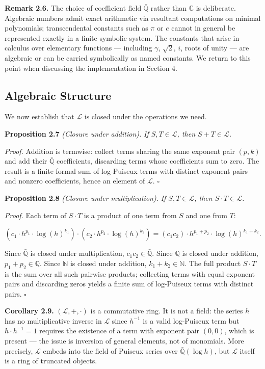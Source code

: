 \documentclass[12pt]{article}
\begin{document}
\textbf{Remark 2.6.} The choice of coefficient field
\(\bar{\mathbb{Q}}\) rather than \(\mathbb{C}\) is deliberate. Algebraic
numbers admit exact arithmetic via resultant computations on minimal
polynomials; transcendental constants such as \(\pi\) or \(e\) cannot in
general be represented exactly in a finite symbolic system. The
constants that arise in calculus over elementary functions --- including
\(\gamma\), \(\sqrt{2}\), \(i\), roots of unity --- are algebraic or can
be carried symbolically as named constants. We return to this point when
discussing the implementation in Section 4.


\subsection{Algebraic Structure}\label{algebraic-structure}

We now establish that \(\mathcal{L}\) is closed under the operations we
need.

\textbf{Proposition 2.7} \emph{(Closure under addition).} \emph{If
\(S, T \in \mathcal{L}\), then \(S + T \in \mathcal{L}\).}

\emph{Proof.} Addition is termwise: collect terms sharing the same
exponent pair \((p, k)\) and add their \(\bar{\mathbb{Q}}\)
coefficients, discarding terms whose coefficients sum to zero. The
result is a finite formal sum of log-Puiseux terms with distinct
exponent pairs and nonzero coefficients, hence an element of
\(\mathcal{L}\). \(\square\)

\textbf{Proposition 2.8} \emph{(Closure under multiplication).} \emph{If
\(S, T \in \mathcal{L}\), then \(S \cdot T \in \mathcal{L}\).}

\emph{Proof.} Each term of \(S \cdot T\) is a product of one term from
\(S\) and one from \(T\):

\[(c_1 \cdot h^{p_1} \cdot \log(h)^{k_1}) \cdot (c_2 \cdot h^{p_2} \cdot \log(h)^{k_2}) = (c_1 c_2) \cdot h^{p_1 + p_2} \cdot \log(h)^{k_1 + k_2}.\]

Since \(\bar{\mathbb{Q}}\) is closed under multiplication,
\(c_1 c_2 \in \bar{\mathbb{Q}}\). Since \(\mathbb{Q}\) is closed under
addition, \(p_1 + p_2 \in \mathbb{Q}\). Since \(\mathbb{N}\) is closed
under addition, \(k_1 + k_2 \in \mathbb{N}\). The full product
\(S \cdot T\) is the sum over all such pairwise products; collecting
terms with equal exponent pairs and discarding zeros yields a finite sum
of log-Puiseux terms with distinct pairs. \(\square\)

\textbf{Corollary 2.9.} \((\mathcal{L}, +, \cdot)\) is a commutative
ring. It is not a field: the series \(h\) has no multiplicative inverse
in \(\mathcal{L}\) since \(h^{-1}\) is a valid log-Puiseux term but
\(h \cdot h^{-1} = 1\) requires the existence of a term with exponent
pair \((0, 0)\), which is present --- the issue is inversion of general
elements, not of monomials. More precisely, \(\mathcal{L}\) embeds into
the field of Puiseux series over \(\bar{\mathbb{Q}}(\log h)\), but
\(\mathcal{L}\) itself is a ring of truncated objects.
\end{document}
